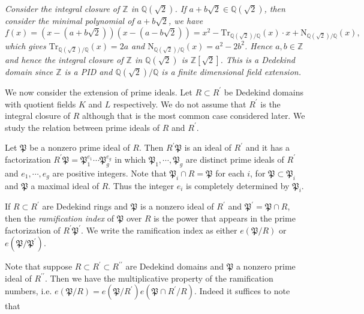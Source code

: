 \begin{example}\em\label{DedeExtenEx}
Consider the integral closure of $\mathbb{Z}$ in $\mathbb{Q}(\sqrt{2})$. If $a+b\sqrt{2}\in\mathbb{Q}(\sqrt{2})$, then consider the minimal polynomial of $a+b\sqrt{2}$, we have 
$$
f\left( x \right) =\left( x-\left( a+b\sqrt{2} \right) \right) \left( x-\left( a-b\sqrt{2} \right) \right) =x^2-\mathrm{Tr}_{\mathbb{Q} \left( \sqrt{2} \right) /\mathbb{Q}}\left( x \right) \cdot x+\mathrm{N}_{\mathbb{Q} \left( \sqrt{2} \right) /\mathbb{Q}}\left( x \right) ,
$$
which gives $\mathrm{Tr}_{\mathbb{Q}(\sqrt{2})/\mathbb{Q}}(x)=2a$ and $\mathrm{N}_{\mathbb{Q}(\sqrt{2})/\mathbb{Q}}(x)=a^2-2b^2$. Hence $a,b\in\mathbb{Z}$ and hence the integral closure of $\mathbb{Z}$ in $\mathbb{Q}(\sqrt{2})$ is $\mathbb{Z}[\sqrt{2}]$. This is a Dedekind domain since $\mathbb{Z}$ is a PID and $\mathbb{Q}(\sqrt{2})/\mathbb{Q}$ is a finite dimensional field extension.
\end{example}
We now consider the extension of prime ideals. Let $R\subset R^\prime$ be Dedekind domains with quotient fields $K$ and $L$ respectively. We do not assume that $R^\prime$ is the integral closure of $R$ although that is the most common case considered later. We study the relation between prime ideals of $R$ and $R^\prime$.\par
Let $\mathfrak{P}$ be a nonzero prime ideal of $R$. Then $R^\prime\mathfrak{P}$ is an ideal of $R^\prime$ and it has a factorization $R^\prime\mathfrak{P}=\mathfrak{P}_1^{e_1}\cdots\mathfrak{P}_g^{e_g}$ in which $\mathfrak{P}_1,\cdots,\mathfrak{P}_g$ are distinct prime ideals of $R^\prime$ and $e_1,\cdots,e_g$ are positive integers. Note that $\mathfrak{P}_i\cap R=\mathfrak{P}$ for each $i$, for $\mathfrak{P}\subset\mathfrak{P}_i$ and $\mathfrak{P}$ a maximal ideal of $R$. Thus the integer $e_i$ is completely determined by $\mathfrak{P}_i$.
\begin{definition}
If $R\subset R^\prime$ are Dedekind rings and $\mathfrak{P}$ is a nonzero ideal of $R^\prime$ and $\mathfrak{P}^\prime=\mathfrak{P}\cap R$, then the \textit{ramification index} of $\mathfrak{P}$ over $R$ is the power that appears in the prime factorization of $R^\prime\mathfrak{P}^\prime$. We write the ramification index as either $e(\mathfrak{P}/R)$ or $e(\mathfrak{P}/\mathfrak{P}^\prime)$.
\end{definition}
Note that suppose $R\subset R^\prime\subset R^{\prime\prime}$ are Dedekind domains and $\mathfrak{P}$ a nonzero prime ideal of $R^{\prime\prime}$. Then we have the multiplicative property of the ramification numbers, i.e. $e\left( \mathfrak{P} /R \right) =e\left( \mathfrak{P} /R^{\prime} \right) e\left( \mathfrak{P} \cap R^{\prime}/R \right) $. Indeed it suffices to note that 
